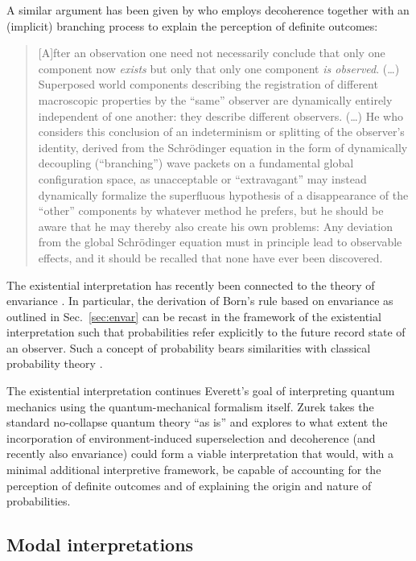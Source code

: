 \documentclass[rmp,aps,amsmath,amsfonts,noshowkeys,noshowpacs,12pt]{revtex4}
\begin{document}
A similar argument has been given by \citet{Zeh:1993:lt} who
employs decoherence together with an (implicit) branching process to
explain the perception of definite outcomes: 
%
\begin{quote} {\small
    [A]fter an observation one need not necessarily conclude that only
    one component now \emph{exists} but only that only one component
    \emph{is observed}.  (\dots) Superposed world components
    describing the registration of different macroscopic properties by
    the ``same'' observer are dynamically entirely independent of one
    another: they describe different observers. (\dots) He who
    considers this conclusion of an indeterminism or splitting of the
    observer's identity, derived from the Schr\"odinger equation in
    the form of dynamically decoupling (``branching'') wave packets on a
    fundamental global configuration space, as unacceptable or
    ``extravagant'' may instead dynamically formalize the superfluous
    hypothesis of a disappearance of the ``other'' components by
    whatever method he prefers, but he should be aware that he may
    thereby also create his own problems: Any deviation from the
    global Schr\"odinger equation must in principle lead to observable
    effects, and it should be recalled that none have ever been
    discovered.
}\end{quote}
%
The existential interpretation has recently been connected to the
theory of envariance \citep[see][and
Sec.~\ref{sec:envar}]{Zurek:2004:yb}. In particular, the derivation of
Born's rule based on envariance as outlined in Sec.~\ref{sec:envar}
can be recast in the framework of the existential interpretation such
that probabilities refer explicitly to the future record state of an
observer. Such a concept of probability  bears similarities with
classical probability theory \citep[for more details on these ideas,
see][]{Zurek:2004:yb}.

The existential interpretation continues Everett's goal of
interpreting quantum mechanics using the quantum-mechanical formalism
itself. Zurek takes the standard no-collapse quantum theory ``as is''
and explores to what extent the incorporation of environment-induced
superselection and decoherence (and recently also envariance) could
form a viable interpretation that would, with a minimal additional
interpretive framework, be capable of accounting for the perception of
definite outcomes and of explaining the origin and nature of
probabilities.


\subsection{Modal interpretations}
\end{document}
